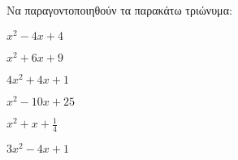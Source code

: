 Να παραγοντοποιηθούν τα παρακάτω τριώνυμα:
\begin{multicols}{2}
\begin{alist}
\item $ x^2-4x+4 $
\item $ x^2+6x+9 $
\item $ 4x^2+4x+1 $
\item $ x^2-10x+25 $
\item $ x^2+x+\frac{1}{4} $
\item $ 3x^2-4x+1 $
\end{alist}
\end{multicols}

